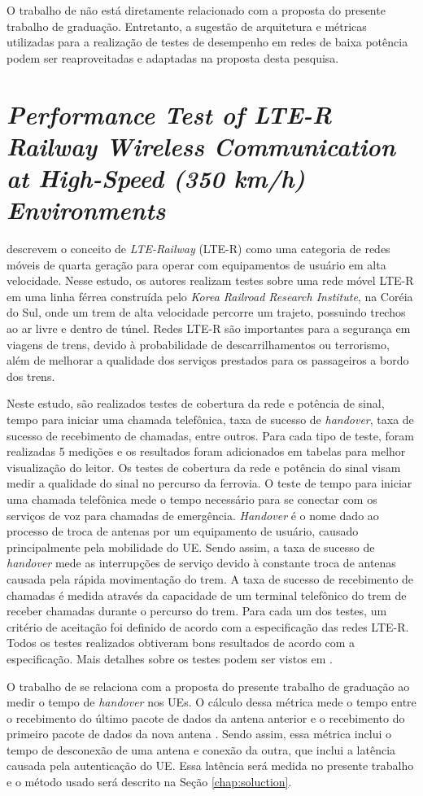O trabalho de \cite{Boano2018} não está diretamente relacionado com a proposta do presente trabalho de graduação.
Entretanto, a sugestão de arquitetura e métricas utilizadas para a realização de testes de desempenho em redes de baixa potência podem ser reaproveitadas e adaptadas na proposta desta pesquisa.

\section{\textit{Performance Test of LTE-R Railway Wireless Communication at High-Speed (350 km/h) Environments}}

\cite{MahnSuk2018} descrevem o conceito de \textit{LTE-Railway} (LTE-R) como uma categoria de redes móveis de quarta geração para operar com equipamentos de usuário em alta velocidade.
Nesse estudo, os autores realizam testes sobre uma rede móvel LTE-R em uma linha férrea construída pelo \textit{Korea Railroad Research Institute}, na Coréia do Sul, onde um trem de alta velocidade percorre um trajeto, possuindo trechos ao ar livre e dentro de túnel.
Redes LTE-R são importantes para a segurança em viagens de trens, devido à probabilidade de descarrilhamentos ou terrorismo, além de melhorar a qualidade dos serviços prestados para os passageiros a bordo dos trens.

Neste estudo, são realizados testes de cobertura da rede e potência de sinal, tempo para iniciar uma chamada telefônica, taxa de sucesso de \textit{handover}, taxa de sucesso de recebimento de chamadas, entre outros.
Para cada tipo de teste, foram realizadas 5 medições e os resultados foram adicionados em tabelas para melhor visualização do leitor.
Os testes de cobertura da rede e potência do sinal visam medir a qualidade do sinal no percurso da ferrovia.
O teste de tempo para iniciar uma chamada telefônica mede o tempo necessário para se conectar com os serviços de voz para chamadas de emergência.
\textit{Handover} é o nome dado ao processo de troca de antenas por um equipamento de usuário, causado principalmente pela mobilidade do UE. Sendo assim, a taxa de sucesso de \textit{handover} mede as interrupções de serviço devido à constante troca de antenas causada pela rápida movimentação do trem.
A taxa de sucesso de recebimento de chamadas é medida através da capacidade de um terminal telefônico do trem de receber chamadas durante o percurso do trem.
Para cada um dos testes, um critério de aceitação foi definido de acordo com a especificação das redes LTE-R. Todos os testes realizados obtiveram bons resultados de acordo com a especificação. Mais detalhes sobre os testes podem ser vistos em \cite{MahnSuk2018}.

O trabalho de \cite{MahnSuk2018} se relaciona com a proposta do presente trabalho de graduação ao medir o tempo de \textit{handover} nos UEs.
O cálculo dessa métrica mede o tempo entre o recebimento do último pacote de dados da antena anterior e o recebimento do primeiro pacote de dados da nova antena \cite{Tayyab2019}.
Sendo assim, essa métrica inclui o tempo de desconexão de uma antena e conexão da outra, que inclui a latência causada pela autenticação do UE.
Essa latência será medida no presente trabalho e o método usado será descrito na Seção \ref{chap:soluction}.
